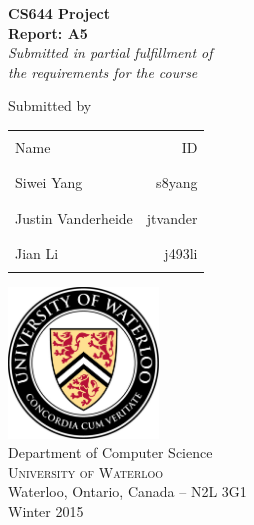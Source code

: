 \documentclass[12pt,letterpaper]{article}
\begin{document}
\begin{titlepage}
\begin{center}

\Large \textbf { {\bf CS644 Project} \\ Report: A5}\\[0.5in]

       \small \emph{Submitted in partial fulfillment of\\
        the requirements for the course}
        \vspace{.2in}

\normalsize Submitted by \\
\begin{table}[h]
\centering
\begin{tabular}{lr}\hline \\
Name & ID\\ \\ \hline
\\
Siwei Yang & s8yang \\ \\ \hline
\\
Justin Vanderheide & jtvander \\ \\ \hline
\\
Jian Li & j493li \\ \\ \hline
\end{tabular}
\end{table}

\vfill

\includegraphics[width=0.3\textwidth]{../res/UWLogo}\\[1.1in]
\Large{Department of Computer Science}\\
\normalsize
\textsc{University of Waterloo}\\
Waterloo, Ontario, Canada -- N2L 3G1 \\
\vspace{0.2cm}
Winter 2015

\end{center}
\end{titlepage}
\end{document}
